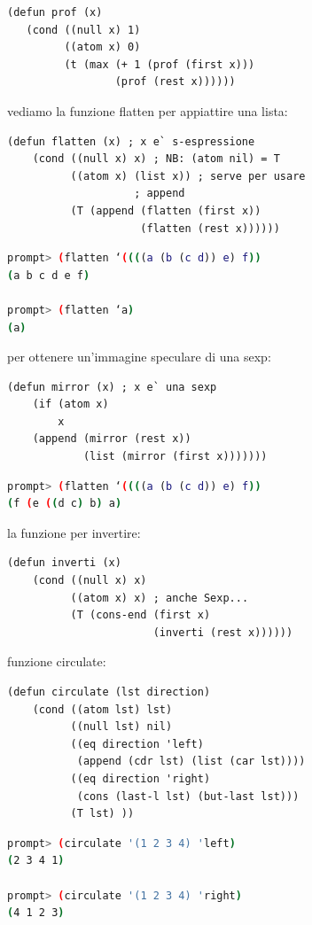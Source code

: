 \documentclass[a4paper,12pt, oneside]{book}
\begin{document}
\begin{verbatim}
(defun prof (x)
   (cond ((null x) 1)
         ((atom x) 0)
         (t (max (+ 1 (prof (first x)))
                 (prof (rest x))))))
\end{verbatim}
vediamo la funzione flatten per appiattire una lista:
\begin{verbatim}
(defun flatten (x) ; x e` s-espressione
    (cond ((null x) x) ; NB: (atom nil) = T
          ((atom x) (list x)) ; serve per usare
                    ; append
          (T (append (flatten (first x))
                     (flatten (rest x))))))
\end{verbatim}
\begin{shaded}
	\begin{lstlisting}[language=bash]
prompt> (flatten ‘((((a (b (c d)) e) f)) 
(a b c d e f)

prompt> (flatten ‘a) 
(a)
\end{lstlisting}
\end{shaded}
per ottenere un'immagine speculare di una sexp:
\begin{verbatim}
(defun mirror (x) ; x e` una sexp
    (if (atom x)
        x
    (append (mirror (rest x))
            (list (mirror (first x)))))))
\end{verbatim}
\begin{shaded}
	\begin{lstlisting}[language=bash]
prompt> (flatten ‘((((a (b (c d)) e) f)) 
(f (e ((d c) b) a)
\end{lstlisting}
\end{shaded}
la funzione per invertire:
\begin{verbatim}
(defun inverti (x)
    (cond ((null x) x)
          ((atom x) x) ; anche Sexp...
          (T (cons-end (first x)
                       (inverti (rest x))))))
\end{verbatim}
funzione circulate:
\begin{verbatim}
(defun circulate (lst direction)
    (cond ((atom lst) lst)
          ((null lst) nil)
          ((eq direction 'left)
           (append (cdr lst) (list (car lst))))
          ((eq direction 'right)
           (cons (last-l lst) (but-last lst)))
          (T lst) ))
\end{verbatim}
\begin{shaded}
	\begin{lstlisting}[language=bash]
prompt> (circulate '(1 2 3 4) 'left)
(2 3 4 1)

prompt> (circulate '(1 2 3 4) 'right)
(4 1 2 3)
\end{lstlisting}
\end{shaded}
\end{document}
